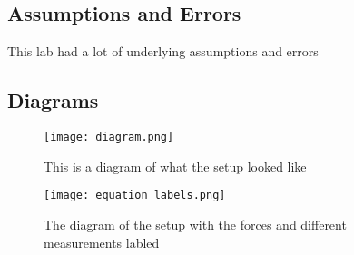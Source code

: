 \documentclass{report}
\begin{document}
\subsection*{Assumptions and Errors}
\indent This lab had a lot of underlying assumptions and errors

\newpage
\subsection*{Diagrams}
\begin{figure}[h]
\texttt{[image: diagram.png]}
\caption{This is a diagram of what the setup looked like}
\texttt{[image: equation\_labels.png]}
\caption{The diagram of the setup with the forces and different measurements labled}
\end{figure}
\end{document}

